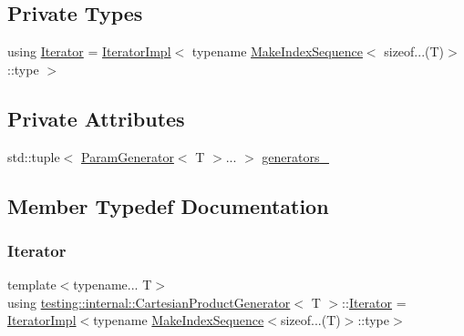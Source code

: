 \subsection*{Private Types}
\begin{DoxyCompactItemize}
\item 
using \hyperlink{classtesting_1_1internal_1_1CartesianProductGenerator_a01d41f7e7634ce6c4408af397f86bce3}{Iterator} = \hyperlink{classtesting_1_1internal_1_1CartesianProductGenerator_1_1IteratorImpl}{Iterator\+Impl}$<$ typename \hyperlink{structtesting_1_1internal_1_1MakeIndexSequence}{Make\+Index\+Sequence}$<$ sizeof...(T)$>$\+::type $>$
\end{DoxyCompactItemize}
\subsection*{Private Attributes}
\begin{DoxyCompactItemize}
\item 
std\+::tuple$<$ \hyperlink{classtesting_1_1internal_1_1ParamGenerator}{Param\+Generator}$<$ T $>$... $>$ \hyperlink{classtesting_1_1internal_1_1CartesianProductGenerator_adb1f110ba803c09b0b1c38b7602652b1}{generators\+\_\+}
\end{DoxyCompactItemize}


\subsection{Member Typedef Documentation}
\mbox{\label{classtesting_1_1internal_1_1CartesianProductGenerator_a01d41f7e7634ce6c4408af397f86bce3}} 
\subsubsection{\texorpdfstring{Iterator}{Iterator}}
{\footnotesize\ttfamily template$<$typename... T$>$ \\
using \hyperlink{classtesting_1_1internal_1_1CartesianProductGenerator}{testing\+::internal\+::\+Cartesian\+Product\+Generator}$<$ T $>$\+::\hyperlink{classtesting_1_1internal_1_1CartesianProductGenerator_a01d41f7e7634ce6c4408af397f86bce3}{Iterator} =  \hyperlink{classtesting_1_1internal_1_1CartesianProductGenerator_1_1IteratorImpl}{Iterator\+Impl}$<$typename \hyperlink{structtesting_1_1internal_1_1MakeIndexSequence}{Make\+Index\+Sequence}$<$sizeof...(T)$>$\+::type$>$\hspace{0.3cm}{\ttfamily [private]}}

